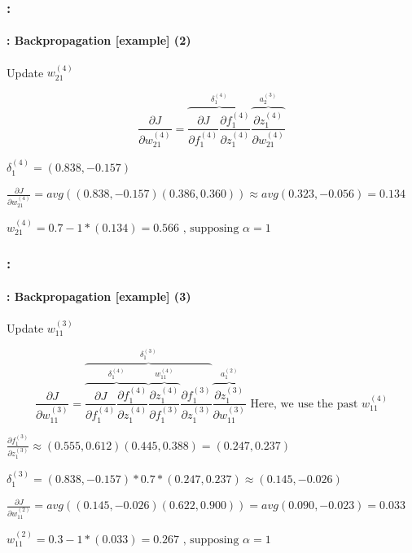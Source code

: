 \documentclass[xcolor=table]{beamer}
\begin{document}
\begin{frame}
	\frametitle{\insertshortsubtitle: \insertsection}
	\framesubtitle{\insertsubsection: Backpropagation [example] (2)}
	
	Update $w_{21}^{(4)}$
	
	\small
	
	\[
	\frac{\partial J}{\partial w_{21}^{(4)}} = \overbrace{\frac{\partial J}{\partial f_{1}^{(4)}} \frac{\partial f_{1}^{(4)}}{\partial z_{1}^{(4)}}}^{\delta_{1}^{(4)}} \overbrace{\frac{\partial z_{1}^{(4)}}{\partial w_{21}^{(4)}}}^{a_{2}^{(3)}}
	\]
	
	
	$
	\delta_{1}^{(4)} = (0.838, -0.157)
	$
	
	$
	\frac{\partial J}{\partial w_{21}^{(4)}} = avg((0.838, -0.157) (0.386, 0.360)) 
	\approx avg(0.323, -0.056) = 0.134
	$
	
	$
	w_{21}^{(4)} = 0.7 - 1 * (0.134) = 0.566 \text{ , supposing } \alpha = 1
	$

\end{frame}

\begin{frame}
	\frametitle{\insertshortsubtitle: \insertsection}
	\framesubtitle{\insertsubsection: Backpropagation [example] (3)}
	
	Update $w_{11}^{(3)}$
	
	\small
	
	\[
	\frac{\partial J}{\partial w_{11}^{(3)}} = 
	\overbrace{
		\overbrace{
			\frac{\partial J}{\partial f_{1}^{(4)}} 
			\frac{\partial f_{1}^{(4)}}{\partial z_{1}^{(4)}}
		}^{\delta_{1}^{(4)}} 
		\overbrace{
			\frac{\partial z_{1}^{(4)}}{\partial f_{1}^{(3)}}
		}^{w_{11}^{(4)}} 
		\frac{\partial f_{1}^{(3)}}{\partial z_{1}^{(3)}} 
	}^{\delta_{1}^{(3)}} 
	\overbrace{
		\frac{\partial z_{1}^{(3)}}{\partial w_{11}^{(3)}}
	}^{a_{1}^{(2)}}
	\text{ Here, we use the past } w_{11}^{(4)}
	\]
	
	$
	\frac{\partial f_{1}^{(3)}}{\partial z_{1}^{(3)}} \approx 
	(0.555, 0.612) (0.445, 0.388) = (0.247, 0.237)
	$
	
	$
	\delta_{1}^{(3)} = (0.838, -0.157) * 0.7 * (0.247, 0.237) \approx (0.145, -0.026)
	$
	
	$
	\frac{\partial J}{\partial w_{11}^{(2)}} = avg((0.145, -0.026) (0.622, 0.900)) 
	= avg(0.090, -0.023) = 0.033
	$
	
	$
	w_{11}^{(2)} = 0.3 - 1 * (0.033) = 0.267 \text{ , supposing } \alpha = 1
	$

\end{frame}
\end{document}
